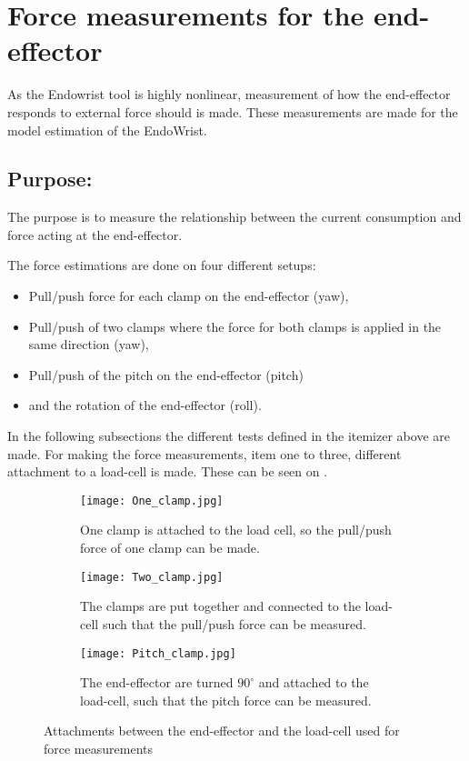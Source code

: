 \section{Force measurements for the end-effector} %

As the Endowrist tool is highly nonlinear, measurement of how the end-effector responds to external force should is made. These measurements are made for the model estimation of the EndoWrist.  

\subsection*{Purpose:}
The purpose is to measure the relationship between the current consumption and force acting at the end-effector.

The force estimations are done on four different setups:
\begin{itemize}
\item Pull/push force for each clamp on the end-effector (yaw),
\item Pull/push of two clamps where the force for both clamps is applied in the same direction (yaw),
\item Pull/push of the pitch on the end-effector (pitch)
\item and the rotation of the end-effector (roll).
\end{itemize}

In the following subsections the different tests defined in the itemizer above are made. For making the force measurements, item one to three, different attachment to a load-cell is made. These can be seen on .
\begin{figure}[H]
	\centering
	\begin{subfigure}{.32\textwidth}
		\centering
		\vspace{-12pt}
		\texttt{[image: One\_clamp.jpg]}
		\caption{One clamp is attached to the load cell, so the pull/push force of one clamp can be made.}
		\label{fig:one_clamp}
	\end{subfigure}
	\begin{subfigure}{.32\textwidth}
		\centering
		\texttt{[image: Two\_clamp.jpg]}
		\caption{The clamps are put together and connected to the load-cell such that the pull/push force can be measured.}
		\label{fig:two_clamp}
	\end{subfigure}
	\begin{subfigure}{.32\textwidth}
		\centering
		\texttt{[image: Pitch\_clamp.jpg]}
		\caption{The end-effector are turned $90^\circ$ and attached to the load-cell, such that the pitch force can be measured.}
		\label{fig:pitch_force}
	\end{subfigure}
\caption{Attachments between the end-effector and the load-cell used for force measurements}
\label{fig:Overview_endowrist_attachment}
\end{figure}

